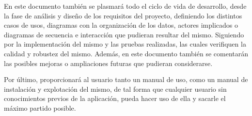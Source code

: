 En este documento también se plasmará todo el ciclo de vida de desarrollo, desde
la fase de análisis y diseño de los requisitos del proyecto, definiendo los
distintos casos de usos, diagramas con la organización de los datos, actores
implicados o diagramas de secuencia e interacción que pudieran resultar del
mismo. Siguiendo por la implementación del mismo y las pruebas realizadas, las
cuales verifiquen la calidad y robustez del mismo. Además, en este documento
también se comentarán las posibles mejoras o ampliaciones futuras que pudieran
considerarse.

Por último, proporcionará al usuario tanto un manual de uso, como un manual de
instalación y explotación del mismo, de tal forma que cualquier usuario sin
conocimientos previos de la aplicación, pueda hacer uso de ella y sacarle el
máximo partido posible.
